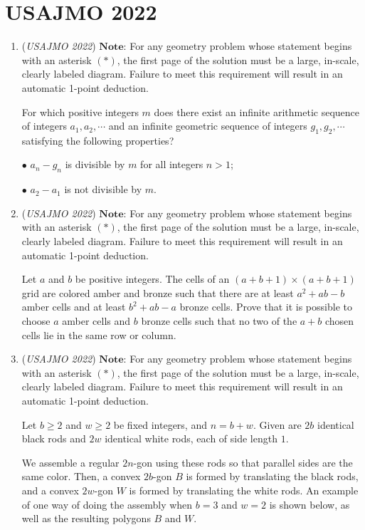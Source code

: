 \section{USAJMO 2022}
        \begin{enumerate}
        	\item (\textit{USAJMO 2022}) $\textbf{Note:}$ For any geometry problem whose statement begins with an asterisk $(*)$, the first page of the solution must be a large, in-scale, clearly labeled diagram. Failure to meet this requirement will result in an automatic 1-point deduction.


 For which positive integers $m$ does there exist an infinite arithmetic sequence of integers $a_1,a_2,\cdots$ and an infinite geometric sequence of integers $g_1,g_2,\cdots$ satisfying the following properties?


 $\bullet$ $a_n-g_n$ is divisible by $m$ for all integers $n>1$;


 $\bullet$ $a_2-a_1$ is not divisible by $m$.


 

	\item (\textit{USAJMO 2022}) $\textbf{Note:}$ For any geometry problem whose statement begins with an asterisk $(*)$, the first page of the solution must be a large, in-scale, clearly labeled diagram. Failure to meet this requirement will result in an automatic 1-point deduction.


 Let $a$ and $b$ be positive integers. The cells of an $(a + b + 1)\times (a + b + 1)$ grid are colored amber and bronze such that there are at least $a^2+ab-b$ amber cells and at least $b^2+ab-a$ bronze cells. Prove that it is possible to choose $a$ amber cells and $b$ bronze cells such that no two of the $a+b$ chosen cells lie in the same row or column.


 

	\item (\textit{USAJMO 2022}) $\textbf{Note:}$ For any geometry problem whose statement begins with an asterisk $(*)$, the first page of the solution must be a large, in-scale, clearly labeled diagram. Failure to meet this requirement will result in an automatic 1-point deduction.


 Let $b\geq2$ and $w\geq2$ be fixed integers, and $n=b+w$. Given are $2b$ identical black rods and $2w$ identical white rods, each of side length $1$.


 We assemble a regular $2n$-gon using these rods so that parallel sides are the same color. Then, a convex $2b$-gon $B$ is formed by translating the black rods, and a convex $2w$-gon $W$ is formed by translating the white rods. An example of one way of doing the assembly when $b=3$ and $w=2$ is shown below, as well as the resulting polygons $B$ and $W$.



\end{enumerate}
